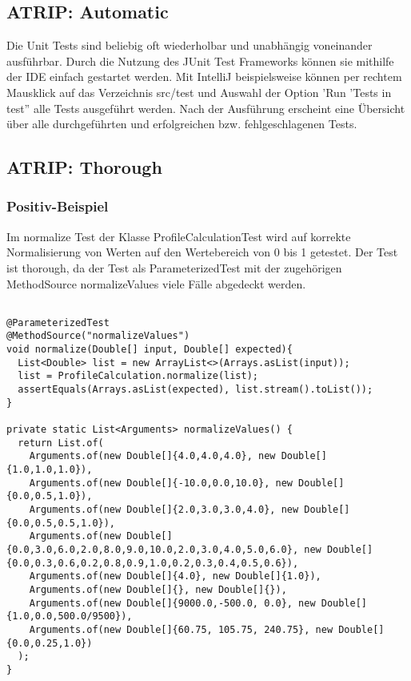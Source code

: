 \subsection{ATRIP: Automatic}

Die Unit Tests sind beliebig oft wiederholbar und unabhängig voneinander ausführbar. Durch die Nutzung des JUnit Test Frameworks können sie mithilfe der IDE einfach gestartet werden.
Mit IntelliJ beispielsweise können per rechtem Mausklick auf das Verzeichnis src/test und Auswahl der Option 'Run 'Tests in test'' alle Tests ausgeführt werden.
Nach der Ausführung erscheint eine Übersicht über alle durchgeführten und erfolgreichen bzw. fehlgeschlagenen Tests.

\subsection{ATRIP: Thorough}

\subsubsection{Positiv-Beispiel}

Im normalize Test der Klasse ProfileCalculationTest wird auf korrekte Normalisierung von Werten auf den Wertebereich von 0 bis 1 getestet.
Der Test ist thorough, da der Test als ParameterizedTest mit der zugehörigen MethodSource normalizeValues viele Fälle abgedeckt werden.

\begin{lstlisting}

@ParameterizedTest
@MethodSource("normalizeValues")
void normalize(Double[] input, Double[] expected){
  List<Double> list = new ArrayList<>(Arrays.asList(input));
  list = ProfileCalculation.normalize(list);
  assertEquals(Arrays.asList(expected), list.stream().toList());
}

private static List<Arguments> normalizeValues() {
  return List.of(
    Arguments.of(new Double[]{4.0,4.0,4.0}, new Double[]{1.0,1.0,1.0}),
    Arguments.of(new Double[]{-10.0,0.0,10.0}, new Double[]{0.0,0.5,1.0}),
    Arguments.of(new Double[]{2.0,3.0,3.0,4.0}, new Double[]{0.0,0.5,0.5,1.0}),
    Arguments.of(new Double[]{0.0,3.0,6.0,2.0,8.0,9.0,10.0,2.0,3.0,4.0,5.0,6.0}, new Double[]{0.0,0.3,0.6,0.2,0.8,0.9,1.0,0.2,0.3,0.4,0.5,0.6}),
    Arguments.of(new Double[]{4.0}, new Double[]{1.0}),
    Arguments.of(new Double[]{}, new Double[]{}),
    Arguments.of(new Double[]{9000.0,-500.0, 0.0}, new Double[]{1.0,0.0,500.0/9500}),
    Arguments.of(new Double[]{60.75, 105.75, 240.75}, new Double[]{0.0,0.25,1.0})
  );
}

\end{lstlisting}

